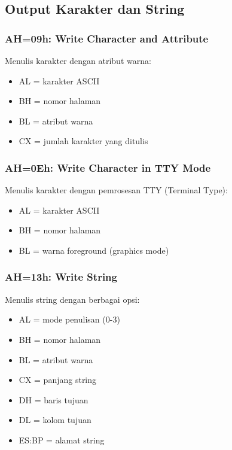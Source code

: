 \documentclass[../main.tex]{subfiles}
\begin{document}
        \subsection{Output Karakter dan String}
            \subsubsection{AH=09h: Write Character and Attribute}
                Menulis karakter dengan atribut warna:
                \begin{itemize}
                    \item AL = karakter ASCII
                    \item BH = nomor halaman
                    \item BL = atribut warna
                    \item CX = jumlah karakter yang ditulis
                \end{itemize}

            \subsubsection{AH=0Eh: Write Character in TTY Mode}
                Menulis karakter dengan pemrosesan TTY (Terminal Type):
                \begin{itemize}
                    \item AL = karakter ASCII
                    \item BH = nomor halaman
                    \item BL = warna foreground (graphics mode)
                \end{itemize}

            \subsubsection{AH=13h: Write String}
                Menulis string dengan berbagai opsi:
                \begin{itemize}
                    \item AL = mode penulisan (0-3)
                    \item BH = nomor halaman
                    \item BL = atribut warna
                    \item CX = panjang string
                    \item DH = baris tujuan
                    \item DL = kolom tujuan
                    \item ES:BP = alamat string
                \end{itemize}
\end{document}
